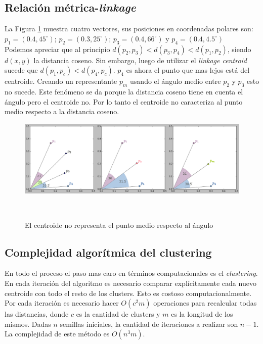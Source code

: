 \subsection{Relaci\'on m\'etrica-\textit{linkage}}

La Figura \ref{fig:cos_cen} muestra cuatro vectores, sus posiciones en coordenadas
polares son: $ p_1 = (0.4, 45^\circ)$;  $p_2 = (0.3, 25^\circ)$;  $p_3 = (0.4, 66^\circ)$
y $p_4 = (0.4, 4.5^\circ) $ \\

Podemos apreciar que al principio $d(p_2,p_3) < d(p_3,p_4) < d(p_1,p_2)$, siendo
$d(x,y)$ la distancia coseno. Sin embargo, luego de utilizar el 
\textit{linkage centroid} sucede que $d(p_1,p_c) < d(p_4,p_c)$. $p_4$
es ahora el punto que mas lejos est\'a del centroide. Creando un representante
$p_m$ usando el \'angulo medio entre $p_2$ y $p_3$ esto no sucede. Este fen\'omeno
se da porque la distancia coseno tiene en cuenta el \'angulo pero el centroide
no. Por lo tanto el centroide no caracteriza al punto medio respecto a la
distancia coseno.\\

\begin{figure}[h!]
                                                                                                                        
\begin{minipage}[b]{\textwidth}
    \includegraphics[width=\textwidth]{img/cosine_centroid.png}
    \caption{El centroide no representa el punto medio respecto al \'angulo}
    \label{fig:cos_cen}
\end{minipage} ~

\end{figure}  

\subsection{Complejidad algor\'itmica del clustering}

En todo el proceso el paso mas caro en t\'erminos computacionales es el
\textit{clustering}. En cada iteraci\'on del algoritmo es necesario comparar 
expl\'icitamente cada nuevo centroide con todo el resto de los clusters. Esto 
es costoso computacionalmente. Por cada iteraci\'on es necesario hacer $O(c^2 m)$
operaciones para recalcular todas las distancias, donde $c$ es la cantidad de
clusters y $m$ es la longitud de los mismos. Dadas $n$ semillas iniciales, la 
cantidad de iteraciones a realizar son $n-1$. La complejidad de este m\'etodo es
$O(n^3 m)$.

